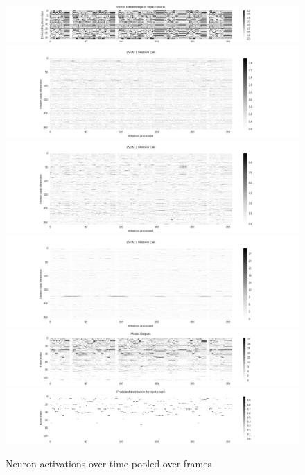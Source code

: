 \documentclass[dissertation.tex]{subfiles}
\begin{document}
\begin{figure}[htpb]
    \centering
    \includegraphics[width=1.0\linewidth]{Figures/model-analysis-chords-0.png}
    \includegraphics[width=1.0\linewidth]{Figures/model-analysis-chords-1.png}
    \includegraphics[width=1.0\linewidth]{Figures/model-analysis-chords-2.png}
    \includegraphics[width=1.0\linewidth]{Figures/model-analysis-chords-3.png}
    \includegraphics[width=1.0\linewidth]{Figures/model-analysis-chords-4.png}
    \includegraphics[width=1.0\linewidth]{Figures/model-analysis-chords-5.png}
    \caption{Neuron activations over time pooled over frames}
    \label{fig:model-analysis-frames}
\end{figure}
\end{document}
